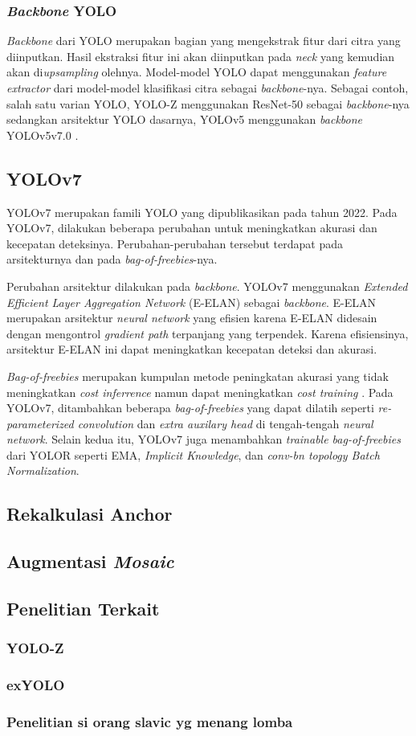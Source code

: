  \subsubsection{\emph{Backbone} YOLO}
    \emph{Backbone} dari YOLO merupakan bagian yang mengekstrak fitur dari citra yang diinputkan.
    Hasil ekstraksi fitur ini akan diinputkan pada \emph{neck} yang kemudian akan di\emph{upsampling} olehnya.
    Model-model YOLO dapat menggunakan \emph{feature extractor} dari model-model klasifikasi citra sebagai \emph{backbone}-nya.
    Sebagai contoh, salah satu varian YOLO, YOLO-Z menggunakan ResNet-50 sebagai \emph{backbone}-nya sedangkan arsitektur YOLO dasarnya, YOLOv5 menggunakan \emph{backbone} YOLOv5v7.0 \parencite{yoloz}.




\subsection{YOLOv7}
  YOLOv7 merupakan famili YOLO yang dipublikasikan pada tahun 2022.
  Pada YOLOv7, dilakukan beberapa perubahan untuk meningkatkan akurasi dan kecepatan deteksinya.
  Perubahan-perubahan tersebut terdapat pada arsitekturnya dan pada \emph{bag-of-freebies}-nya.

  Perubahan arsitektur dilakukan pada \emph{backbone}. YOLOv7 menggunakan \emph{Extended Efficient Layer Aggregation Network} (E-ELAN) sebagai \emph{backbone}.
  E-ELAN merupakan arsitektur \emph{neural network} yang efisien karena E-ELAN didesain dengan mengontrol \emph{gradient path} terpanjang yang terpendek.
  Karena efisiensinya, arsitektur E-ELAN ini dapat meningkatkan kecepatan deteksi dan akurasi.

  \emph{Bag-of-freebies} merupakan kumpulan metode peningkatan akurasi yang tidak meningkatkan \emph{cost inferrence} namun dapat meningkatkan \emph{cost training} \parencite{yolov4}. 
  Pada YOLOv7, ditambahkan beberapa \emph{bag-of-freebies} yang dapat dilatih seperti \emph{re-parameterized convolution} dan \emph{extra auxilary head} di tengah-tengah \emph{neural network}.
  Selain kedua itu, YOLOv7 juga menambahkan \emph{trainable bag-of-freebies} dari YOLOR seperti EMA, \emph{Implicit Knowledge}, dan \emph{conv-bn topology Batch Normalization}.

\subsection{Rekalkulasi Anchor}
  \lipsum[1]
\subsection{Augmentasi \emph{Mosaic}}
  \lipsum[1]

\subsection{Penelitian Terkait}
  \subsubsection{YOLO-Z}
    \lipsum[2]
  \subsubsection{exYOLO}
    \lipsum[2]
  \subsubsection{Penelitian si orang slavic yg menang lomba}
    \lipsum[2]